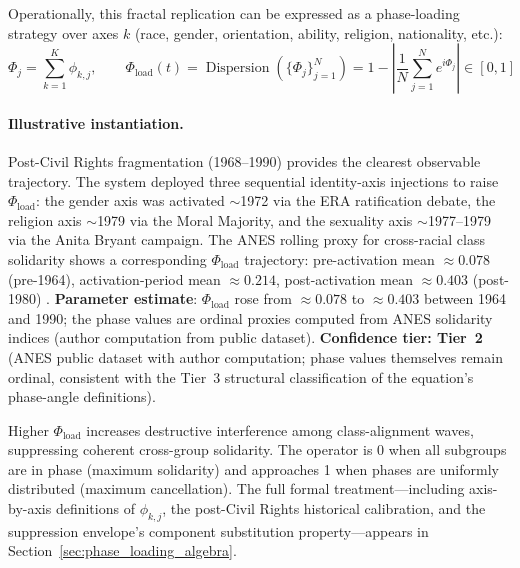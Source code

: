 Operationally, this fractal replication can be expressed as a phase-loading strategy over axes $k$ (race, gender, orientation, ability, religion, nationality, etc.):
\begin{equation}\label{eq:1.11-phase-loading}
\Phi_j = \sum_{k=1}^{K} \phi_{k,j}, \qquad
\Phi_{\text{load}}(t) = \operatorname{Dispersion}\!\left(\{\Phi_j\}_{j=1}^{N}\right) = 1 - \left|\frac{1}{N}\sum_{j=1}^{N} e^{i\Phi_j}\right| \in [0,1]
\end{equation}

\paragraph{Illustrative instantiation.}
Post-Civil Rights fragmentation (1968--1990) provides the clearest observable trajectory. The system deployed three sequential identity-axis injections to raise $\Phi_{\text{load}}$: the gender axis was activated $\sim$1972 via the ERA ratification debate, the religion axis $\sim$1979 via the Moral Majority, and the sexuality axis $\sim$1977--1979 via the Anita Bryant campaign. The ANES rolling proxy for cross-racial class solidarity shows a corresponding $\Phi_{\text{load}}$ trajectory: pre-activation mean $\approx 0.078$ (pre-1964), activation-period mean $\approx 0.214$, post-activation mean $\approx 0.403$ (post-1980) \cite{anes_cumulative, pew_polarization}. \textbf{Parameter estimate}: $\Phi_{\text{load}}$ rose from $\approx 0.078$ to $\approx 0.403$ between 1964 and 1990; the phase values are ordinal proxies computed from ANES solidarity indices (author computation from public dataset). \textbf{Confidence tier: Tier~2} (ANES public dataset with author computation; phase values themselves remain ordinal, consistent with the Tier~3 structural classification of the equation's phase-angle definitions).

Higher $\Phi_{\text{load}}$ increases destructive interference among class-alignment waves, suppressing coherent cross-group solidarity. The operator is 0 when all subgroups are in phase (maximum solidarity) and approaches 1 when phases are uniformly distributed (maximum cancellation). The full formal treatment---including axis-by-axis definitions of $\phi_{k,j}$, the post-Civil Rights historical calibration, and the suppression envelope's component substitution property---appears in Section~\ref{sec:phase_loading_algebra}.

